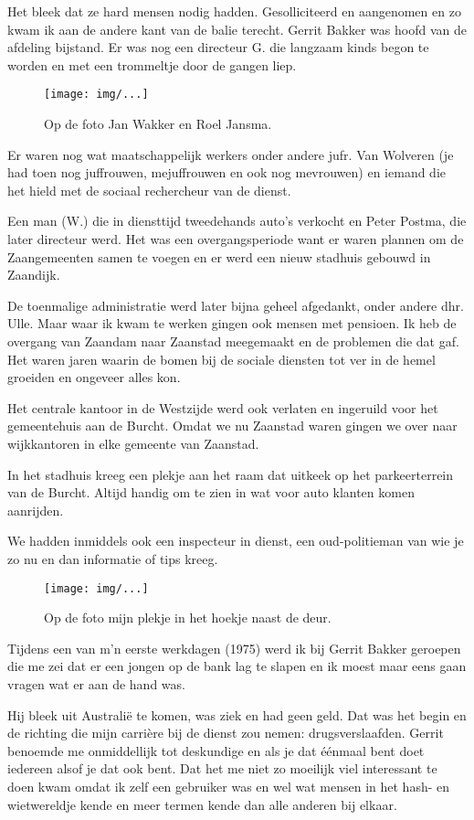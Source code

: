 \documentclass[10pt,twoside,openright]{memoir}
\begin{document}
Het bleek dat ze hard mensen nodig hadden. Gesolliciteerd en aangenomen en zo kwam ik aan de andere kant van de balie terecht. Gerrit Bakker was hoofd van de afdeling bijstand. Er was nog een directeur G. die langzaam kinds begon te worden en met een trommeltje door de gangen liep. 

\begin{figure}[t]
\texttt{[image: img/...]}
\caption{Op de foto Jan Wakker en Roel Jansma.}
\end{figure}

Er waren nog wat maatschappelijk werkers onder andere jufr. Van Wolveren (je had toen nog juffrouwen, mejuffrouwen en ook nog mevrouwen) en iemand die het hield met de sociaal rechercheur van de dienst. 

Een man (W.) die in diensttijd tweedehands auto’s verkocht en Peter Postma, die later directeur werd. Het was een overgangsperiode want er waren plannen om de Zaangemeenten samen te voegen en er werd een nieuw stadhuis gebouwd in Zaandijk. 

De toenmalige administratie werd later bijna geheel afgedankt, onder andere dhr. Ulle. Maar waar ik kwam te werken gingen ook mensen met pensioen. Ik heb de overgang van Zaandam naar Zaanstad meegemaakt en de problemen die dat gaf. Het waren jaren waarin de bomen bij de sociale diensten tot ver in de hemel groeiden en ongeveer alles kon.

Het centrale kantoor in de Westzijde werd ook verlaten en ingeruild voor het gemeentehuis aan de Burcht. Omdat we nu Zaanstad waren gingen we over naar wijkkantoren in elke gemeente van Zaanstad. 

In het stadhuis kreeg een plekje aan het raam dat uitkeek op het parkeerterrein van de Burcht. Altijd handig om te zien in wat voor auto klanten komen aanrijden. 

We hadden inmiddels ook een inspecteur in dienst, een oud-politieman van wie je zo nu en dan informatie of tips kreeg. 

\begin{figure}[t]
\texttt{[image: img/...]}
\caption{Op de foto mijn plekje in het hoekje naast de deur.}
\end{figure}

Tijdens een van m’n eerste werkdagen (1975) werd ik bij Gerrit Bakker geroepen die me zei dat er een jongen op de bank lag te slapen en ik moest maar eens gaan vragen wat er aan de hand was. 

Hij bleek uit Australië te komen, was ziek en had geen geld. Dat was het begin en de richting die mijn carrière bij de dienst zou nemen: drugsverslaafden. Gerrit benoemde me onmiddellijk tot deskundige en als je dat éénmaal bent doet iedereen alsof je dat ook bent. Dat het me niet zo moeilijk viel interessant te doen kwam omdat ik zelf een gebruiker was en wel wat mensen in het hash- en wietwereldje kende en meer termen kende dan alle anderen bij elkaar. 
\end{document}
